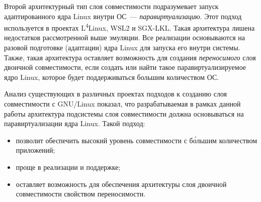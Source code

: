Второй архитектурный тип слоя совместимости подразумевает запуск адаптированного ядра Linux внутри ОС~--- \textit{паравиртуализацию}. Этот подход используется в проектах L\textsuperscript{4}Linux, WSL2 и SGX-LKL. Такая архитектура лишена недостатков рассмотренной выше эмуляции. Все реализации основываются на разовой подготовке (адаптации) ядра Linux для запуска его внутри системы. Также, такая архитектура оставляет возможность для создания \textit{переносимого} слоя двоичной совместимости, если создать или найти такое паравиртуализируемое ядро Linux, которое будет поддерживаться большим количеством ОС.

Анализ существующих в различных проектах подходов к созданию слоя совместимости с GNU/Linux показал, что разрабатываемая в рамках данной работы архитектура подсистемы слоя совместимости должна основываться на паравиртуализации ядра Linux. Такой подход:
\begin{itemize}
    \item позволит обеспечить высокий уровень совместимости с б\'ольшим количеством приложений;
    \item проще в реализации и поддержке;
    \item оставляет возможность для обеспечения архитектуры слоя двоичной совместимости свойством переносимости.
\end{itemize}

